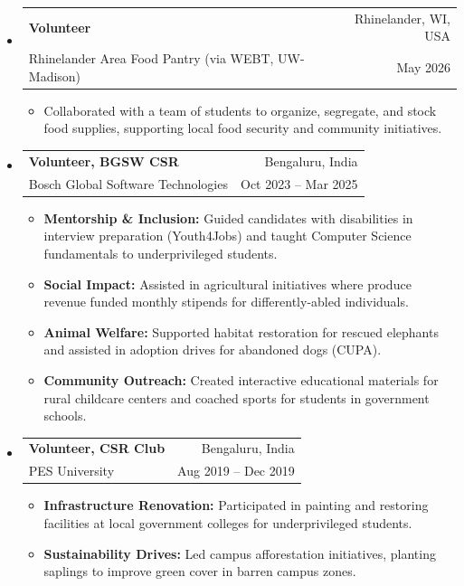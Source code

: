 \documentclass[letterpaper,11pt]{article}
\makeatletter
\newcommand{\resumeItem}[1]{
  \item\small{
    {#1 \vspace{-2pt}}
  }
}
\newcommand{\resumeSubheading}[4]{
  \vspace{-2pt}\item
    \begin{tabular*}{0.97\textwidth}[t]{l@{\extracolsep{\fill}}r}
      \textbf{#1} & #2 \\
      \small#3 & \small #4 \\
    \end{tabular*}\vspace{-7pt}
}
\newcommand{\resumeSubHeadingListStart}{\begin{itemize}[leftmargin=0.15in, label={}]}
\newcommand{\resumeSubHeadingListEnd}{\end{itemize}}
\newcommand{\resumeItemListStart}{\begin{itemize}}
\newcommand{\resumeItemListEnd}{\end{itemize}\vspace{-5pt}}
\makeatother
\begin{document}
\resumeSubHeadingListStart
  \resumeSubheading{Volunteer}{Rhinelander, WI, USA}{Rhinelander Area Food Pantry (via WEBT, UW-Madison)}{May 2026}
      \resumeItemListStart
        \resumeItem{Collaborated with a team of students to organize, segregate, and stock food supplies, supporting local food security and community initiatives.}
      \resumeItemListEnd

  \resumeSubheading{Volunteer, BGSW CSR}{Bengaluru, India}{Bosch Global Software Technologies}{Oct 2023 -- Mar 2025}
      \resumeItemListStart
        \resumeItem{\textbf{Mentorship \& Inclusion:} Guided candidates with disabilities in interview preparation (Youth4Jobs) and taught Computer Science fundamentals to underprivileged students.}
        \resumeItem{\textbf{Social Impact:} Assisted in agricultural initiatives where produce revenue funded monthly stipends for differently-abled individuals.}
        \resumeItem{\textbf{Animal Welfare:} Supported habitat restoration for rescued elephants and assisted in adoption drives for abandoned dogs (CUPA).}
        \resumeItem{\textbf{Community Outreach:} Created interactive educational materials for rural childcare centers and coached sports for students in government schools.}
      \resumeItemListEnd

  \resumeSubheading{Volunteer, CSR Club}{Bengaluru, India}{PES University}{Aug 2019 -- Dec 2019}
      \resumeItemListStart
        \resumeItem{\textbf{Infrastructure Renovation:} Participated in painting and restoring facilities at local government colleges for underprivileged students.}
        \resumeItem{\textbf{Sustainability Drives:} Led campus afforestation initiatives, planting saplings to improve green cover in barren campus zones.}
      \resumeItemListEnd
\resumeSubHeadingListEnd
  
\end{document}
